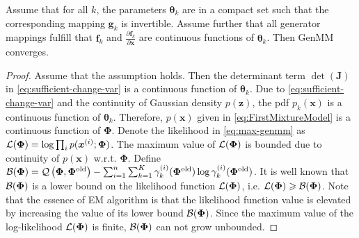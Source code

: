 \begin{proposition}
  Assume that for all $k$, the parameters $\bm{\theta}_k$ are in a compact set such that the corresponding mapping $\bm{g}_k$ is invertible. Assume further that all generator mappings fulfill that $\bm{f}_k$ and $\frac{\partial \bm{f}_k}{\partial \bm{x}}$ are continuous functions of $\bm{\theta}_k$. Then GenMM converges. 
\end{proposition}
\begin{proof}
  Assume that the assumption holds. Then the determinant term $\det(\bm{J})$ in \autoref{eq:sufficient-change-var} is a continuous function of $\bm{\theta}_k$. Due to \autoref{eq:sufficient-change-var} and the continuity of Gaussian density $p(\bm{z})$, the pdf $p_k(\bm{x})$ is a continuous function of $\bm{\theta}_k$. Therefore, $p(\bm{x})$ given in \autoref{eq:FirstMixtureModel} is a continuous function of $\bm{\Phi}$. Denote the likelihood in \autoref{eq:max-genmm} as $\mathcal{L}(\bm{\Phi})=\log \textstyle\prod_{i} p(\bm{x}^{(i)};\bm{\Phi})$. The maximum value of $\mathcal{L}(\bm{\Phi})$ is bounded due to continuity of $p(\bm{x})$ w.r.t. $\bm{\Phi}$.
  Define $\mathcal{B}(\bm{\Phi}) = \mathcal{Q}\left(\bm{\Phi},\bm{\Phi}^{\mathrm{old}}\right) - \sum_{i=1}^n\sum_{k=1}^{K}\gamma_k^{(i)}(\bm{\Phi}^{\mathrm{old}}) \log\gamma_k^{(i)}(\bm{\Phi}^{\mathrm{old}})$. It is well known that $\mathcal{B}(\bm{\Phi})$ is a lower bound on the likelihood function $\mathcal{L}(\bm{\Phi})$, i.e. $\mathcal{L}(\bm{\Phi}) \geqslant \mathcal{B}(\bm{\Phi})$. Note that the essence of EM algorithm is that the likelihood function value is elevated by increasing the value of its lower bound $\mathcal{B}(\bm{\Phi})$. Since the maximum value of the log-likelihood $\mathcal{L}(\bm{\Phi})$ is finite, $\mathcal{B}(\bm{\Phi})$ can not grow unbounded.

\end{proof}
